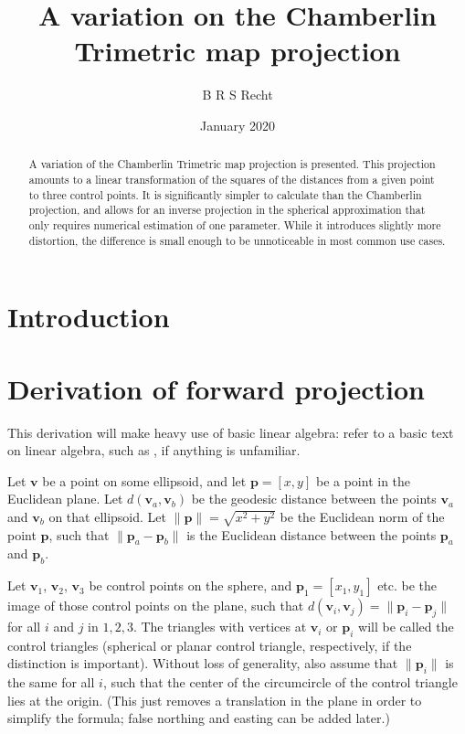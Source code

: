 \documentclass{amsart}[12pt]
\title{A variation on the Chamberlin Trimetric map projection}
\author{B R S Recht}
\date{January 2020}
\begin{document}
\begin{abstract}
   A variation of the Chamberlin Trimetric map projection is presented. This
   projection amounts to a linear transformation of the squares of the distances
   from a given point to three control points. It is significantly simpler to
   calculate than the Chamberlin projection, and allows for an inverse
   projection in the spherical approximation that only requires numerical
   estimation of one parameter. While it introduces slightly more distortion,
   the difference is small enough to be unnoticeable in most common use cases.
\end{abstract}
\maketitle

\section{Introduction}

\cite{christensen}\cite{snyder87}\cite{snyder89}

\section{Derivation of forward projection}
This derivation will make heavy use of basic linear algebra: refer to a basic
text on linear algebra, such as \cite{strang}, if anything is
unfamiliar.

Let $\mathbf v$ be a point on some ellipsoid, and let $\mathbf p = [x, y]$
be a point in the Euclidean plane. Let $d(\mathbf v_a, \mathbf v_b)$ be the
geodesic distance between the points $\mathbf v_a$ and $\mathbf v_b$ on that
ellipsoid. Let $\|\mathbf p\| = \sqrt{x^2 + y^2}$ be the Euclidean norm of the point
$\mathbf p$, such that $\|\mathbf p_a - \mathbf p_b\|$
is the Euclidean distance between the points $\mathbf p_a$ and $\mathbf p_b$.

Let $\mathbf v_1$, $\mathbf v_2$, $\mathbf v_3$ be control points on the sphere,
and $\mathbf p_1 = [x_1, y_1]$ etc. be the image of those control points on the
plane, such that $d(\mathbf v_i, \mathbf v_j) = \|\mathbf p_i - \mathbf p_j\|$
for all $i$ and $j$ in ${1, 2, 3}$. The triangles with vertices at $\mathbf v_i$
or $\mathbf p_i$ will be called the control triangles (spherical or planar
control triangle, respectively, if the distinction is important). Without loss
of generality, also assume that $\|\mathbf p_i\|$ is the same for all $i$, such
that the center of the circumcircle of the control triangle lies at the origin.
(This just removes a translation in the plane in order to simplify the formula;
false northing and easting can be added later.)
\end{document}
